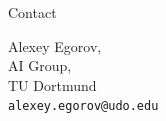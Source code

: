 \begin{columns}[t, onlytextwidth]
\begin{column}{0.40\textwidth}
\begin{block}[equal height group=bottom]{\normalsize Contact}
\begin{multicols}{4}
\begin{figure}
            \end{figure}
            \columnbreak
                \footnotesize
                    Alexey Egorov, \\
                    AI Group, \\
                    TU Dortmund \\
                    \texttt{alexey.egorov@udo.edu}
        \end{multicols}
    \end{block}

  \end{column}%
\end{columns}%

